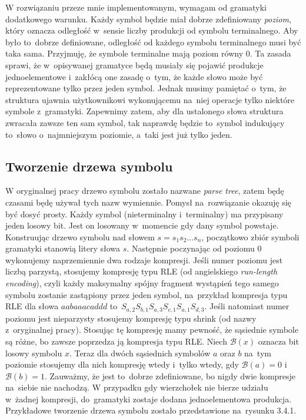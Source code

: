 \documentclass[declaration,shortabstract]{iithesis}
\theoremstyle{definition} \newtheorem{definition}{Definicja}[chapter]
\theoremstyle{plain} \newtheorem{remark}[definition]{Obserwacja}
\theoremstyle{plain} \newtheorem{theorem}[definition]{Twierdzenie}
\theoremstyle{plain} \newtheorem{example}{Przykład}[definition]
\theoremstyle{plain} \newtheorem{lemma}[definition]{Lemat}
\begin{document}
W rozwiązaniu przeze mnie implementowanym, wymagam od gramatyki dodatkowego warunku. Każdy symbol będzie miał dobrze zdefiniowany \textit{poziom}, który oznacza odległość w~sensie liczby produkcji od symbolu terminalnego. Aby było to~dobrze definiowane, odległość od każdego symbolu terminalnego musi być taka sama. Przyjmuję, że symbole terminalne mają poziom równy $0$. Ta zasada sprawi, że w~opisywanej gramatyce będą musiały się pojawić produkcje jednoelementowe i~zakłócą one zasadę o~tym, że każde słowo może być reprezentowane tylko przez jeden symbol. Jednak musimy pamiętać o~tym, że struktura ujawnia użytkownikowi wykonującemu na~niej operacje tylko niektóre symbole z~gramatyki. Zapewnimy zatem, aby dla ustalonego słowa struktura zwracała zawsze ten sam symbol, tak naprawdę będzie to~symbol indukujący to~słowo o~najmniejszym poziomie, a~taki jest już tylko jeden.

\subsection{Tworzenie drzewa symbolu}

W oryginalnej pracy drzewo symbolu zostało nazwane \textit{parse tree}, zatem będę czasami będę używał tych nazw wymiennie. Pomysł na~rozwiązanie okazuję się być dosyć prosty. Każdy symbol (nieterminalny i~terminalny) ma przypisany jeden losowy bit. Jest on losowany w~momencie gdy dany symbol powstaje. Konstruując drzewo symbolu nad słowem $s = s_1 s_2 \ldots s_n$, początkowo zbiór symboli gramatyki stanowią litery słowa $s$. Następnie poczynając od poziomu $0$ wykonujemy naprzemiennie dwa rodzaje kompresji. Jeśli numer poziomu jest liczbą parzystą, stosujemy kompresję typu RLE (od angielskiego \textit{run-length encoding}), czyli każdy maksymalny spójny fragment wystąpień tego samego symbolu zostanie zastąpiony przez jeden symbol, na~przykład kompresja typu RLE dla słowa $aabaaacaddd$ to~$S_{a, 2} S_{b, 1} S_{a, 3} S_{c, 1} S_{a, 1} S_{d, 3}$. Jeśli natomiast numer poziomu jest nieparzysty stosujemy kompresję typu shrink (od nazwy z~oryginalnej pracy). Stosując tę kompresję mamy pewność, że sąsiednie symbole są różne, bo zawsze poprzedza ją kompresja typu RLE. Niech $\mathcal{B}(x)$ oznacza bit losowy symbolu $x$. Teraz dla dwóch sąsiednich symbolów $a$ oraz $b$ na~tym poziomie stosujemy dla nich kompresję wtedy i~tylko wtedy, gdy $\mathcal{B}(a) = 0$ i~$\mathcal{B}(b) = 1$. Zauważmy, że jest to~dobrze zdefiniowane, bo nigdy dwie kompresje na~siebie nie nachodzą. W przypadku gdy wierzchołek nie bierze udziału w~żadnej kompresji, do~gramatyki zostaje dodana jednoelementowa produkcja. Przykładowe tworzenie drzewa symbolu zostało przedstawione na~rysunku 3.4.1.
\end{document}
